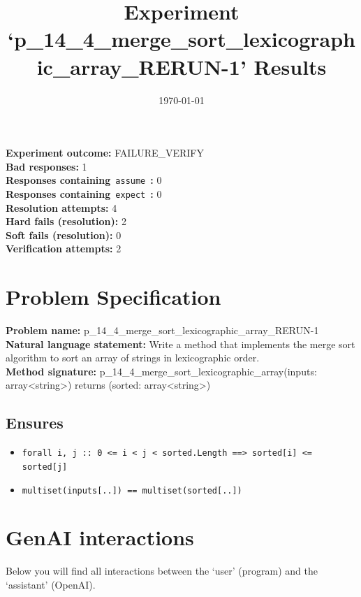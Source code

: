 \documentclass{article}
\begin{document}
\title{Experiment `p\_14\_4\_merge\_sort\_lexicographic\_array\_RERUN-1' Results}
\author{\today}
\date{}
\maketitle
\textbf{Experiment outcome: }FAILURE\_VERIFY
\\\textbf{Bad responses: }1
\\\textbf{Responses containing}~\texttt{assume}~\textbf{: }0
\\\textbf{Responses containing}~\texttt{expect}~\textbf{: }0
\\\textbf{Resolution attempts: }4
\\\textbf{Hard fails (resolution): }2
\\\textbf{Soft fails (resolution): }0
\\\textbf{Verification attempts: }2
\section*{Problem Specification}
\textbf{Problem name: }p\_14\_4\_merge\_sort\_lexicographic\_array\_RERUN-1
\\\textbf{Natural language statement: }Write a method that implements the merge sort algorithm to sort an array of strings in lexicographic order.
\\\textbf{Method signature: }p\_14\_4\_merge\_sort\_lexicographic\_array(inputs: array<string>) returns (sorted: array<string>)
\subsection*{Ensures}
\begin{itemize}
\item \texttt{forall i, j :: 0 <= i < j < sorted.Length ==> sorted[i] <= sorted[j]}
\item \texttt{multiset(inputs[..]) == multiset(sorted[..])}
\end{itemize}
\clearpage
\section*{GenAI interactions}
Below you will find all interactions between the `user' (program) and the `assistant' (OpenAI).
\end{document}
